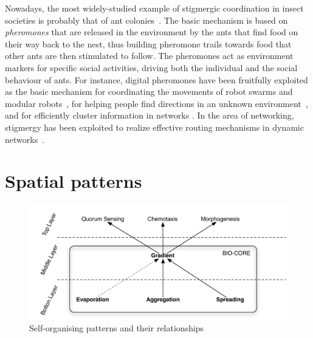 \documentclass[12pt,a4paper,twoside,openright]{book}
\begin{document}
Nowadays, the most widely-studied example of stigmergic coordination in insect societies is probably that of ant colonies~\cite{dorigo-aco2004}.
%
The basic mechanism is based on \emph{pheromones} that are released in the environment by the ants that find food on their way back to the nest, thus building pheromone trails towards food that other ants are then stimulated to follow.
%
The pheromones act as environment markers for specific social activities, driving both the individual and the social behaviour of ants.
%
For instance, digital pheromones \cite{pheromoncoord-aamas2002,stigmergy-e4masII} have been fruitfully exploited as the basic mechanism for coordinating the movements of robot swarms and modular robots~\cite{tota-aamas2005}, for helping people find directions in an unknown environment~\cite{MameiZ07}, and for efficiently cluster information in networks \cite{collectivesort-scico74,wordNet}.
%
In the area of networking, stigmergy has been exploited to realize effective routing mechanisms in dynamic networks~\cite{swarmintelligence-book1999,AC-Survey}.

\section{Spatial patterns}

\begin{figure}
\begin{center}
	\includegraphics[width=\textwidth]{img/sc-basic-mech.pdf}
\end{center}
\caption{Self-organising patterns and their relationships}
\label{fig:patterns} 
\end{figure}
\end{document}
